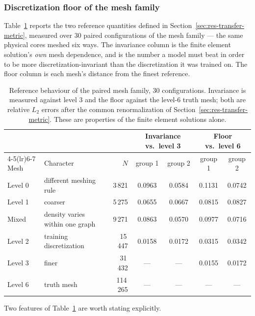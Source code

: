 \documentclass[preprint,12pt]{elsarticle}
\begin{document}
\subsubsection{Discretization floor of the mesh family}
\label{sec:res-meshfloor}

Table~\ref{tab:probefloor} reports the two reference quantities defined in
Section~\ref{sec:res-transfer-metric}, measured over 30 paired configurations
of the mesh family --- the same physical cores meshed six ways. The invariance
column is the finite element solution's \emph{own} mesh dependence, and is the
number a model must beat in order to be more discretization-invariant than the
discretization it was trained on. The floor column is each mesh's distance from
the finest reference.

\begin{table}[htbp]
\centering
\caption{Reference behaviour of the paired mesh family, 30 configurations.
Invariance is measured against level 3 and the floor against the level-6 truth
mesh; both are relative $L_2$ errors after the common renormalization of
Section~\ref{sec:res-transfer-metric}. These are properties of the finite
element solutions alone.}
\label{tab:probefloor}
\begin{tabular}{@{}llrcccc@{}}
\toprule
& & & \multicolumn{2}{c}{Invariance vs.\ level 3}
    & \multicolumn{2}{c}{Floor vs.\ level 6} \\
\cmidrule(lr){4-5}\cmidrule(lr){6-7}
Mesh & Character & $N$ & group 1 & group 2 & group 1 & group 2 \\
\midrule
Level 0 & different meshing rule & 3\,821  & 0.0963 & 0.0584 & 0.1131 & 0.0742 \\
Level 1 & coarser                & 5\,275  & 0.0655 & 0.0667 & 0.0815 & 0.0827 \\
Mixed   & density varies within one graph & 9\,271 & 0.0863 & 0.0570 & 0.0977 & 0.0716 \\
Level 2 & training discretization & 15\,447 & 0.0158 & 0.0172 & 0.0315 & 0.0342 \\
Level 3 & finer                  & 31\,432 & ---    & ---    & 0.0155 & 0.0172 \\
Level 6 & truth mesh             & 114\,265 & ---   & ---    & ---    & ---    \\
\bottomrule
\end{tabular}
\end{table}

Two features of Table~\ref{tab:probefloor} are worth stating explicitly.
\end{document}
